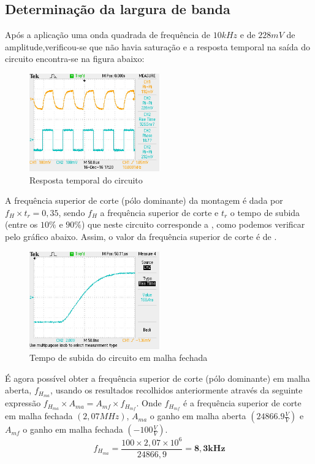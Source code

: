 \documentclass[a4paper]{article}
\begin{document}
    \subsection{Determinação da largura de banda}
        \bigskip
        Após a aplicação uma onda quadrada de frequência de $10kHz$ e de $228mV$ de amplitude,verificou-se que não havia saturação e a resposta temporal na saída do circuito encontra-se na figura abaixo:
        \begin{figure}[H]
            \centering
            \includegraphics[width=0.5\textwidth]{figura8_respostaTemporal.JPG}
            \caption{\label{fig:respostaTemporal}Resposta temporal do circuito}
        \end{figure}
        \medskip
        
        A frequência superior de corte (pólo dominante) da montagem é dada por $f_H\times t_r = 0,35$, sendo $f_H$ a frequência superior de corte e $t_r$ o tempo de subida (entre os $10\%$ e $90\%$) que neste circuito corresponde a , como podemos verificar pelo gráfico abaixo. Assim, o valor da frequência superior de corte é de .
        \begin{figure}[H]
            \centering
            \includegraphics[width=0.5\textwidth]{figura9_tempoSubida.JPG}
            \caption{\label{fig:tempoSubida}Tempo de subida do circuito em malha fechada}
        \end{figure}
        \medskip
        
        É agora possível obter a frequência superior de corte (pólo dominante) em malha aberta, $f_{H_{ma}}$, usando os resultados recolhidos anteriormente através da seguinte expressão $f_{H_{ma}}\times A_{ma} = A_{mf}\times f_{H_{mf}}$. Onde $f_{H_{mf}}$ é a frequência superior de corte em malha fechada $(2,07MHz)$, $A_{ma}$ o ganho em malha aberta $(24866.9\frac{V}{V})$ e $A_{mf}$ o ganho em malha fechada $(-100\frac{V}{V})$.
        $$f_{H_{ma}} = \frac{100\times 2,07\times 10^6}{24866,9} = \bm{8,3kHz}$$
        
\end{document}

